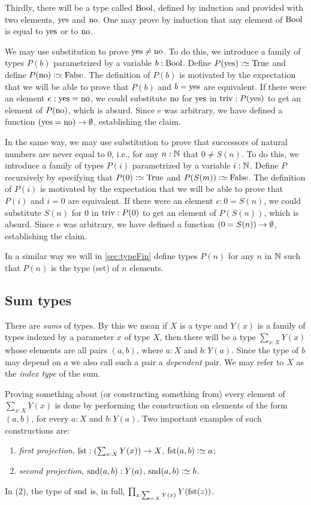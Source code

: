 Thirdly, there will be a type called $\mathrm{Bool}$, 
defined by induction and provided with two elements, $\mathrm{yes}$ and $\mathrm{no}$.  
One may prove by induction
that any element of $\mathrm{Bool}$ is equal to $\mathrm{yes}$ or to $\mathrm{no}$.

We may use substitution to prove $\mathrm{yes} \ne \mathrm{no}$.  To do this, we introduce a family of types $P(b)$ parametrized by a variable $b:\mathrm{Bool}$.
Define $P(\yes) \defeq \true$ and define $P(\no) \defeq \false$.  The definition of $P(b)$ is motivated by the expectation that we will be able
to prove that $P(b)$ and $b = \mathrm{yes}$ are equivalent.  If there were an element $e: \mathrm{yes} = \mathrm{no}$, we could substitute $\mathrm{no}$ for $\mathrm{yes}$ in $\mathrm{triv} :
P (\mathrm{yes})$ to get an element of $P(\mathrm{no})$, which is absurd.  Since $e$ was arbitrary, we have defined a function $(\mathrm{yes}=\mathrm{no}) \to \emptyset$,
establishing the claim.

In the same way, we may use substitution to prove that successors of natural numbers are never equal to $0$, i.e., for any $n:\mathbb{N}$ that $0 \ne
S(n)$.  To do this, we introduce a family of types $P(i)$ parametrized by a variable $i:\mathbb{N}$.  Define $P$ recursively by specifying that $P(0)
\defeq \true$ and $P(S(m)) \defeq \false$.  The definition of $P(i)$ is motivated by the expectation that we will be able to prove that $P(i)$
and $i = 0$ are equivalent.  If there were an element $e: 0 = S(n)$, we could substitute $S(n)$ for $0$ in $\mathrm{triv} : P ( 0 )$ to get an element
of $P(S(n))$, which is absurd.  Since $e$ was arbitrary, we have defined a function $(0=S(n)) \to \emptyset$, establishing the claim.

In a similar way we will in \cref{sec:typeFin} define types $P(n)$ for any $n$ in $\mathbb{N}$
such that $P(n)$ is the type (set) of $n$ elements.

\subsection{Sum types}
\label{sec:sum-types}
There are \emph{sums} of types.  By this we mean if $X$ is a type and $Y(x)$ is a family of types indexed by a parameter $x$ of type $X$, then
there will be a type $\sum _{x:X} Y(x)$ whose elements are all pairs $(a,b)$, where $a:X$ and $b:Y(a)$. Since the type of $b$ may depend on $a$ we also call such a pair
a \emph{dependent} pair. We may refer to $X$ as the \emph{index
  type} of the sum.  

Proving something about (or constructing something from) every 
element of $\sum _{x:X} Y(x)$ is done by performing the construction on elements of the form $(a,b)$, for every $a:X$ and $b: Y(a)$.
Two important examples of such constructions are:
\begin{enumerate}
\item \emph{first projection}, 
$\fst:(\sum _{x:X} Y(x)) \to X$, 
$\fst(a,b)\defeq a$;
\item \emph{second projection},
$\snd(a,b): Y(a)$,
$\snd(a,b)\defeq b$.
\end{enumerate}
In (2), the type of $\snd$ is, in full,
$\prod_{z:\sum_{x:X} Y(x)} Y(\fst(z))$.

